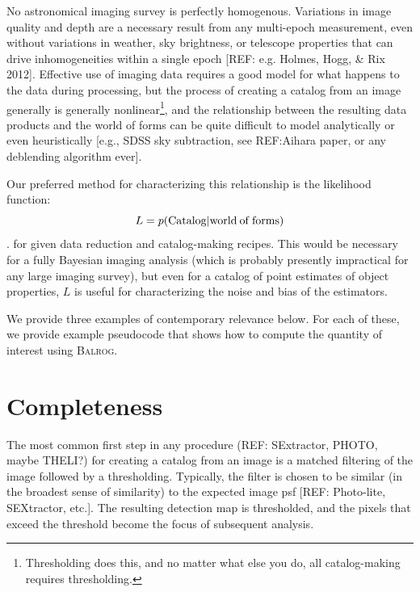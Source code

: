 \documentclass[12pt]{book}
\newcommand{\balrog}{\textsc{Balrog}}
\begin{document}
No astronomical imaging survey is perfectly homogenous. Variations in
image quality and depth are a necessary result from any multi-epoch
measurement, even without variations in weather, sky brightness, or
telescope properties that can drive inhomogeneities within a single
epoch [REF: e.g. Holmes, Hogg, \& Rix 2012]. Effective use of imaging
data requires a good model for what happens to the data during
processing, but the process of creating a catalog from an image
generally is generally nonlinear\footnote{Thresholding does this, and
  no matter what else you do, all catalog-making requires
  thresholding.}, and the relationship between the resulting
data products and the world of forms can be quite difficult to model
analytically or even heuristically [e.g., SDSS sky subtraction, see
REF:Aihara paper, or any deblending algorithm ever].

Our preferred method for characterizing this relationship is the
likelihood function:
\begin{equation}
L = p( {\rm Catalog} | {\rm world\: of\: forms})
\end{equation}.
for given data reduction and catalog-making recipes. This would be
necessary for a fully Bayesian imaging analysis (which is probably presently impractical
for any large imaging survey), but even for a catalog of
point estimates of object properties, $L$ is useful for characterizing
the noise and bias of the estimators.

We provide three examples of contemporary relevance below. For each of
these, we provide example pseudocode that shows how to compute the
quantity of interest using \balrog{}.

\section{Completeness}
The most common first step in any procedure (REF: SExtractor, PHOTO,
maybe THELI?) for creating a catalog from an image is a matched
filtering of the image followed by a thresholding. Typically, the
filter is chosen to be similar (in the broadest sense of similarity)
to the expected image psf [REF: Photo-lite, SEXtractor, etc.]. The
resulting detection map is thresholded, and the pixels that exceed the
threshold become the focus of subsequent analysis.
\end{document}
